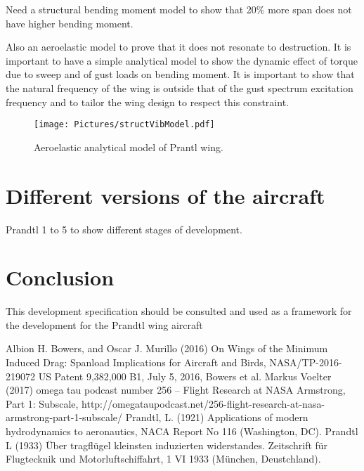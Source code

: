 \documentclass{report}
\begin{document}
Need a structural bending moment model to show that 20\% more span does not have higher bending moment. 

Also an aeroelastic model to prove that it does not resonate to destruction.  It is important to have a simple analytical model to show the dynamic effect of torque due to sweep and of gust loads on bending moment.  It is important to show that the natural frequency of the wing is outside that of the gust spectrum excitation frequency and to tailor the wing design to respect this constraint.


\begin{figure}[htb]
	\begin{center}
		\texttt{[image: Pictures/structVibModel.pdf]}
	\end{center}

	\caption{Aeroelastic analytical model of Prantl wing.}
	\label{fig: structVibModel}
\end{figure}

\section{Different versions of the aircraft}

Prandtl 1 to 5 to show different stages of development.

\section{Conclusion}
This development specification should be consulted and used as a framework for the development for the Prandtl wing aircraft


\begin{thebibliography}{99}
 Albion H. Bowers, and Oscar J. Murillo (2016) On Wings of the Minimum Induced Drag:  Spanload Implications for Aircraft and Birds, NASA/TP-2016-219072
 US Patent 9,382,000 B1, July 5, 2016, Bowers et al.
 Markus Voelter (2017) omega tau podcast number 256 – Flight Research at NASA Armstrong, Part 1: Subscale, http://omegataupodcast.net/256-flight-research-at-nasa-armstrong-part-1-subscale/
 Prandtl, L.  (1921)  Applications  of  modern hydrodynamics  to  aeronautics,  NACA  Report  No  116 (Washington, DC).
 Prandtl L (1933) Über tragfl\"ugel kleinsten induzierten widerstandes. Zeitschrift für Flugtecknik und Motorluftschiffahrt, 1 VI 1933 (M\"unchen, Deustchland).
\end{thebibliography}
\end{document}
